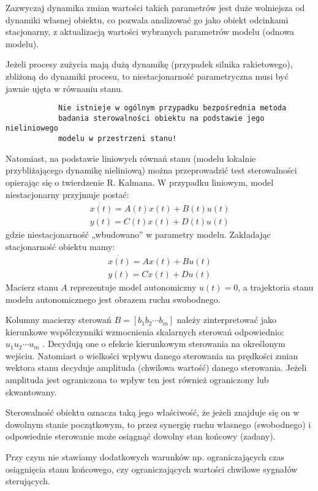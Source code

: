 \documentclass{article}
\begin{document}
		Zazwyczaj dynamika zmian wartości takich parametrów jest duże wolniejsza od dynamiki
		własnej obiektu, co pozwala analizować go jako obiekt odcinkami stacjonarny, z aktualizacją
		wartości wybranych parametrów modelu (odnowa modelu).

		Jeżeli procesy zużycia mają dużą dynamikę (przypadek silnika rakietowego), zbliżoną do
		dynamiki procesu, to niestacjonarność parametryczna musi być jawnie ujęta w równaniu
		stanu.
		\begin{verbatim}
			Nie istnieje w ogólnym przypadku bezpośrednia metoda
			badania sterowalności obiektu na podstawie jego nieliniowego
			modelu w przestrzeni stanu!
		\end{verbatim}

		Natomiast, na podstawie liniowych równań stanu (modelu lokalnie przybliżającego dynamikę
		nieliniową) można przeprowadzić test sterowalności opierając się o twierdzenie R. Kalmana.
		W przypadku liniowym, model niestacjonarny przyjmuje postać:
		\begin{align*}
			\dot{x(t)} = A(t)x(t) + B(t)u(t) \\
			y(t) = C(t)x(t) + D(t)u(t)
		\end{align*}
		gdzie niestacjonarność „wbudowano” w parametry modelu.
		Zakładając stacjonarność obiektu mamy:
		\begin{align*}
			\dot{x(t)} = Ax(t) + Bu(t) \\
			y(t) = Cx(t) + Du(t)
		\end{align*}
		Macierz stanu $A$ reprezentuje model autonomiczny $ u(t) = 0 $, a trajektoria stanu
		modelu autonomicznego jest obrazem ruchu swobodnego.

		Kolumny macierzy sterowań $B = [b_1 b_2 \cdots b_m]$ należy zinterpretować jako kierunkowe
		współczynniki wzmocnienia skalarnych sterowań odpowiednio: $u_1 u_2 \cdots u_m$ . Decydują
		one o efekcie kierunkowym sterowania na określonym wejściu. Natomiast o wielkości
		wpływu danego sterowania na prędkości zmian wektora stanu decyduje amplituda
		(chwilowa wartość) danego sterowania. Jeżeli amplituda jest ograniczona 
		to wpływ ten jest również ograniczony lub skwantowany.

		Sterowalność obiektu oznacza taką jego właściwość,
		że jeżeli znajduje się on w
		dowolnym stanie początkowym, to przez synergię ruchu własnego (swobodnego) i
		odpowiednie sterowanie może osiągnąć dowolny stan końcowy (zadany).

		Przy czym nie stawiamy dodatkowych warunków np. ograniczających czas osiągnięcia
		stanu końcowego, czy ograniczających wartości chwilowe sygnałów sterujących.
\end{document}

